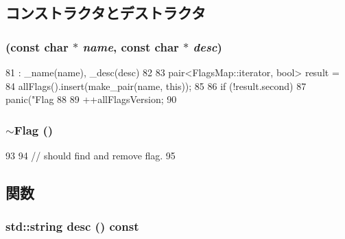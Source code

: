 \subsection{コンストラクタとデストラクタ}
\hypertarget{classDebug_1_1Flag_a11f52f24efc3fb0429e0a704e8673ba4}{
\subsubsection[{Flag}]{ (const char $\ast$ {\em name}, \/  const char $\ast$ {\em desc})}}
\label{classDebug_1_1Flag_a11f52f24efc3fb0429e0a704e8673ba4}



\begin{DoxyCode}
81     : _name(name), _desc(desc)
82 {
83     pair<FlagsMap::iterator, bool> result =
84         allFlags().insert(make_pair(name, this));
85 
86     if (!result.second)
87         panic("Flag %
88 
89     ++allFlagsVersion;
90 }
\end{DoxyCode}
\hypertarget{classDebug_1_1Flag_aa8e6bebe8bd3bd3cfd34256964c048ca}{
\subsubsection[{$\sim$Flag}]{\setlength{\rightskip}{0pt plus 5cm}$\sim${\bf Flag} ()}}
\label{classDebug_1_1Flag_aa8e6bebe8bd3bd3cfd34256964c048ca}



\begin{DoxyCode}
93 {
94     // should find and remove flag.
95 }
\end{DoxyCode}


\subsection{関数}
\hypertarget{classDebug_1_1Flag_a4d78734376449f458cadb533cab6290f}{
\subsubsection[{desc}]{\setlength{\rightskip}{0pt plus 5cm}std::string desc () const}}
\label{classDebug_1_1Flag_a4d78734376449f458cadb533cab6290f}



